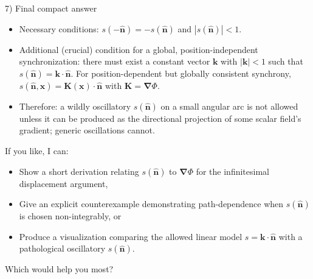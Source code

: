 \documentclass[a4paper]{article}
\theoremstyle{plain}
\theoremstyle{definition}
\newcommand{\vect}[1]{\mathbf{#1}}
\newcommand{\hatvec}[1]{\hat{\mathbf{#1}}}
\newcommand{\del}{\bm{\nabla}}
\begin{document}
7) Final compact answer

\begin{itemize}
\item Necessary conditions: $s(-\hatvec{n}) = -s(\hatvec{n})$ and
  $|s(\hatvec{n})| < 1$.
\item Additional (crucial) condition for a global,
  position-independent synchronization: there must exist a constant
  vector $\vect{k}$ with $|\vect{k}| < 1$ such that
  $s(\hatvec{n}) = \vect{k} \cdot \hatvec{n}$.  For position-dependent
  but globally consistent synchrony,
  $s(\hatvec{n}, \vect{x}) = \vect{K}(\vect{x}) \cdot \hatvec{n}$
  with $\vect{K} = \del \Phi$.
\item Therefore: a wildly oscillatory $s(\hatvec{n})$ on a small
  angular arc is not allowed unless it can be produced as the
  directional projection of some scalar field's gradient; generic
  oscillations cannot.
\end{itemize}

If you like, I can:
\begin{itemize}
\item Show a short derivation relating $s(\hatvec{n})$ to $\del \Phi$
  for the infinitesimal displacement argument,
\item Give an explicit counterexample demonstrating path-dependence
  when $s(\hatvec{n})$ is chosen non-integrably, or
\item Produce a visualization comparing the allowed linear model
  $s = \vect{k} \cdot \hatvec{n}$ with a pathological oscillatory
  $s(\hatvec{n})$.
\end{itemize}

Which would help you most?
\end{document}
